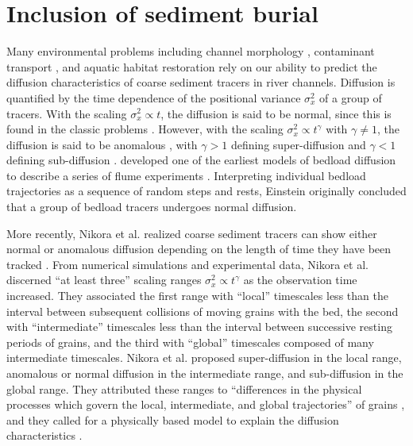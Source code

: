 
\chapter{Inclusion of sediment burial}
\label{ch:downDiff}

Many environmental problems including channel morphology \citep{Hassan2017}, contaminant transport \citep{Macklin2006}, and aquatic habitat restoration \citep{Gaeuman2017} rely on our ability to predict the diffusion characteristics of coarse sediment tracers in river channels.
Diffusion is quantified by the time dependence of the positional variance $\sigma_x^2$ of a group of tracers.
With the scaling $\sigma_x^2 \propto t$, the diffusion is said to be normal, since this is found in the classic problems \citep{Taylor1920}.
However, with the scaling $\sigma_x^2 \propto t^\gamma$ with $\gamma \neq 1$, the diffusion is said to be anomalous \citep{Sokolov2012}, with $\gamma>1$ defining super-diffusion and $\gamma<1$ defining sub-diffusion \citep{Metzler2000}.
\citet{Einstein1937} developed one of the earliest models of bedload diffusion to describe a series of flume experiments \citep{Ettema2014}.
Interpreting individual bedload trajectories as a sequence of random steps and rests, Einstein originally concluded that a group of bedload tracers undergoes normal diffusion.

More recently, Nikora et al. realized coarse sediment tracers can show either normal or anomalous diffusion depending on the length of time they have been tracked \citep{Nikora2001a,Nikora2002}.
From numerical simulations and experimental data, Nikora et al. discerned ``at least three'' scaling ranges $\sigma_x^2 \propto t^\gamma$ as the observation time increased.
They associated the first range with ``local'' timescales less than the interval between subsequent collisions of moving grains with the bed, the second with ``intermediate'' timescales less than the interval between successive resting periods of grains, and the third with ``global'' timescales composed of many intermediate timescales.
Nikora et al. proposed super-diffusion in the local range, anomalous or normal diffusion in the intermediate range, and sub-diffusion in the global range.
They attributed these ranges to ``differences in the physical processes which govern the local, intermediate, and global trajectories'' of grains \citep{Nikora2001a}, and they called for a physically based model to explain the diffusion characteristics \citep{Nikora2002}.

